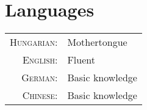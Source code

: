 \documentclass[10pt]{article}
\begin{document}
\section{Languages}
\begin{tabular}{rl}
\textsc{Hungarian:}&Mothertongue\\
\textsc{English:}&Fluent\\
\textsc{German:}&Basic knowledge\\
\textsc{Chinese:}&Basic knowledge\\
\end{tabular}

\newpage
\thispagestyle{empty}



\end{document}
